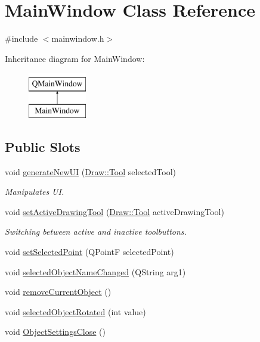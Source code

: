 \hypertarget{class_main_window}{}\section{Main\+Window Class Reference}
\label{class_main_window}


{\ttfamily \#include $<$mainwindow.\+h$>$}

Inheritance diagram for Main\+Window\+:\begin{figure}[H]
\begin{center}
\leavevmode
\includegraphics[height=2.000000cm]{class_main_window}
\end{center}
\end{figure}
\subsection*{Public Slots}
\begin{DoxyCompactItemize}
\item 
void \hyperlink{class_main_window_a91d63c0ae1ebabef78c51f976b763deb}{generate\+New\+UI} (\hyperlink{class_draw_aef97a848de7a634c35c3ce678be88b9b}{Draw\+::\+Tool} selected\+Tool)
\begin{DoxyCompactList}\small\item\em Manipulates UI. \end{DoxyCompactList}\item 
void \hyperlink{class_main_window_ae60e9e64c47018bff59b20337b688936}{set\+Active\+Drawing\+Tool} (\hyperlink{class_draw_aef97a848de7a634c35c3ce678be88b9b}{Draw\+::\+Tool} active\+Drawing\+Tool)
\begin{DoxyCompactList}\small\item\em Switching between active and inactive toolbuttons. \end{DoxyCompactList}\item 
void \hyperlink{class_main_window_aeeedb3580798df598118c8ba5cc00bdc}{set\+Selected\+Point} (Q\+PointF selected\+Point)
\item 
void \hyperlink{class_main_window_a8470c69051b3351a0092a7e5ff9544ae}{selected\+Object\+Name\+Changed} (Q\+String arg1)
\item 
void \hyperlink{class_main_window_aafbbe3246ed07db4db9e15a2f8c8e065}{remove\+Current\+Object} ()
\item 
void \hyperlink{class_main_window_ab8f93e7d5a8de635dc170392cfe29167}{selected\+Object\+Rotated} (int value)
\item 
void \hyperlink{class_main_window_a636bb6145b1b4afa1d5efd1ed7075212}{Object\+Settings\+Close} ()
\end{DoxyCompactItemize}

